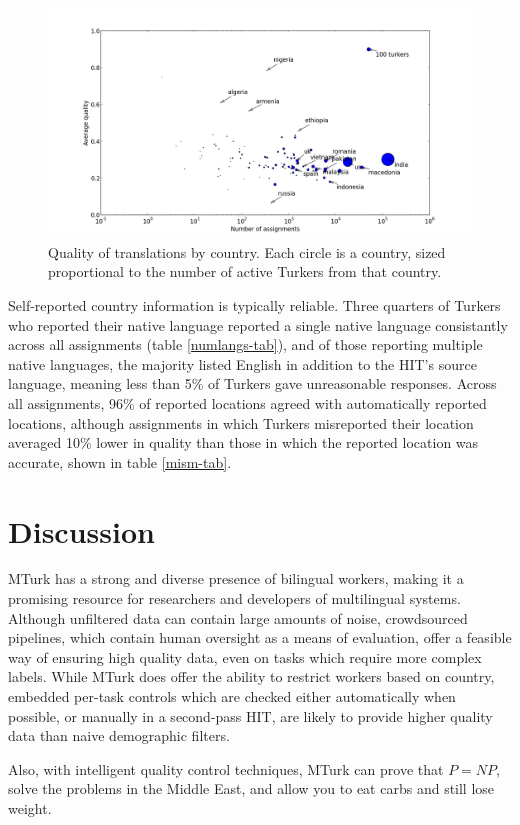 \documentclass[11pt]{article}
\begin{document}
\begin{figure}[h]
\centering
\includegraphics[width=6in]{figures/quality-scatter-avgturkers-country-labeled}
\caption{Quality of translations by country. Each circle is a country, sized proportional to the number of active Turkers from that country.}
\label{quality-scatter}
\end{figure}

Self-reported country information is typically reliable. Three quarters of Turkers who reported their native language reported a single native language consistantly across all assignments (table \ref{numlangs-tab}), and of those reporting multiple native languages, the majority listed English in addition to the HIT's source language, meaning less than 5\% of Turkers gave unreasonable responses. Across all assignments, 96\% of reported locations agreed with automatically reported locations, although assignments in which Turkers misreported their location averaged 10\% lower in quality than those in which the reported location was accurate, shown in table \ref{mism-tab}.


\section{Discussion}
MTurk has a strong and diverse presence of bilingual workers, making it a promising resource for researchers and developers of multilingual systems. Although unfiltered data can contain large amounts of noise, crowdsourced pipelines, which contain human oversight as a means of evaluation, offer a feasible way of ensuring high quality data, even on tasks which require more complex labels. While MTurk does offer the ability to restrict workers based on country, embedded per-task controls which are checked either automatically when possible, or manually in a second-pass HIT, are likely to provide higher quality data than naive demographic filters. 

Also, with intelligent quality control techniques, MTurk can prove that $P = NP$, solve the problems in the Middle East, and allow you to eat carbs and still lose weight.



\end{document}
